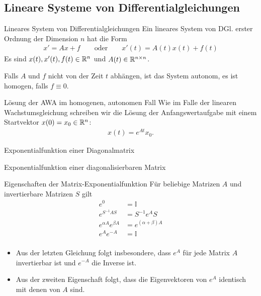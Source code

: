 \subsection{Lineare Systeme von Differentialgleichungen}
\frame{\subtoc}

\begin{frame}
  \begin{block}{Lineares System von Differentialgleichungen}
    Ein lineares System von DGl. erster Ordnung der Dimension $n$ hat
    die Form
    \begin{gather*}
      x' = Ax + f
      \qquad\text{oder}\qquad
      x'(t) = A(t)x(t) + f(t)
    \end{gather*}
    Es sind $x(t), x'(t), f(t) \in \mathbb R^n$ und $A(t)\in \mathbb R^{n\times n}$.
    
    Falls $A$ und $f$ nicht von der Zeit $t$ abhängen, ist das System
    autonom, es ist homogen, falls $f\equiv0$.
  \end{block}

  \begin{block}{Lösung der AWA im homogenen, autonomen Fall}
    Wie im Falle der linearen Wachstumsgleichung schreiben wir die
    Lösung der Anfangswertaufgabe mit einem Startvektor $x(0) = x_0\in\mathbb R^n$:
    \begin{gather*}
      x(t) = e^{At} x_0.
    \end{gather*}
  \end{block}
\end{frame}

\begin{frame}{Exponentialfunktion einer Diagonalmatrix}
\end{frame}

\begin{frame}{Exponentialfunktion einer diagonalisierbaren Matrix}
  
\end{frame}

\begin{frame}{Eigenschaften der Matrix-Exponentialfunktion}
  Für beliebige Matrizen $A$ und invertierbare Matrizen $S$ gilt
  \begin{align*}
    e^0 &= \mathbb I\\
    e^{S^{-1}AS} &= S^{-1} e^A S\\
    e^{\alpha A} e^{\beta A} &= e^{(\alpha+\beta) A}\\
    e^{A}e^{-A} &= \mathbb I\\
  \end{align*}
  \begin{itemize}
  \item Aus der letzten Gleichung folgt insbesondere, dass $e^A$ für jede
    Matrix $A$ invertierbar ist und $e^{-A}$ die Inverse ist.
  \item Aus der zweiten Eigenschaft folgt, dass die Eigenvektoren von
    $e^A$ identisch mit denen von $A$ sind.
  \end{itemize}
\end{frame}


